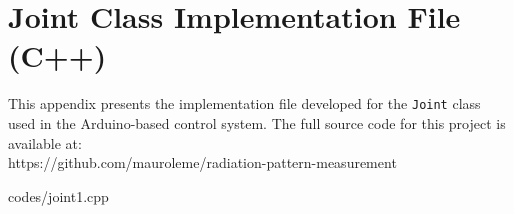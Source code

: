 \chapter{Joint Class Implementation File (C++)}
\label{apendice4}

This appendix presents the implementation file developed for the
\texttt{Joint} class used in the Arduino-based control system. The full source code for this project is available at:\\ https://github.com/mauroleme/radiation-pattern-measurement


{codes/joint1.cpp}
